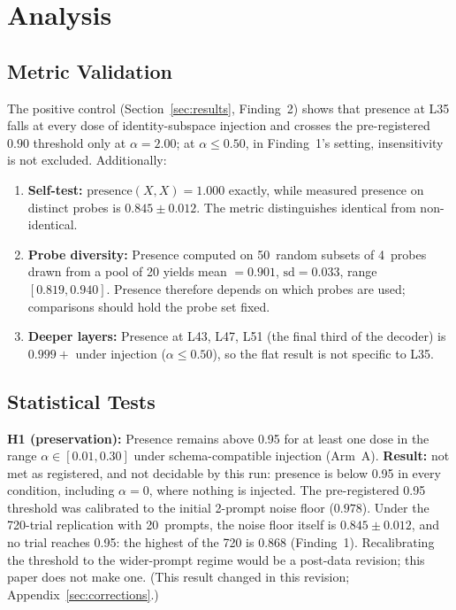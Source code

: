 \documentclass[11pt,a4paper]{article}
\begin{document}
\section{Analysis}
\label{sec:analysis}

\subsection{Metric Validation}

The positive control (Section~\ref{sec:results}, Finding~2)
shows that presence at L35 falls at every dose of identity-subspace
injection and crosses the pre-registered $0.90$ threshold only at
$\alpha = 2.00$; at $\alpha \le 0.50$, in Finding~1's setting,
insensitivity is not excluded. Additionally:

\begin{enumerate}[nosep]
  \item \textbf{Self-test:} $\text{presence}(X, X) = 1.000$ exactly, while
    measured presence on distinct probes is $0.845 \pm 0.012$. The metric
    distinguishes identical from non-identical.
  \item \textbf{Probe diversity:} Presence computed on 50~random subsets of
    4~probes drawn from a pool of 20 yields mean $= 0.901$, $\text{sd}{=}0.033$,
    range $[0.819, 0.940]$. Presence therefore depends on which probes
    are used; comparisons should hold the probe set fixed.
  \item \textbf{Deeper layers:} Presence at L43, L47, L51 (the final third
    of the decoder) is $0.999{+}$ under injection ($\alpha \le 0.50$), so
    the flat result is not specific to L35.
\end{enumerate}

\subsection{Statistical Tests}

\textbf{H1 (preservation):} Presence remains above 0.95 for at least one
dose in the range $\alpha \in [0.01, 0.30]$ under schema-compatible
injection (Arm~A). \textbf{Result:} not met as registered, and not
decidable by this run: presence is below 0.95 in every condition,
including $\alpha = 0$, where nothing is injected. The pre-registered
0.95 threshold was calibrated to the initial 2-prompt noise floor
($0.978$). Under the 720-trial replication with 20~prompts,
the noise floor itself is $0.845 \pm 0.012$, and no trial reaches 0.95:
the highest of the 720 is $0.868$ (Finding~1). Recalibrating the threshold to the wider-prompt regime would be a
post-data revision; this paper does not make one. (This result changed
in this revision; Appendix~\ref{sec:corrections}.)
\end{document}
